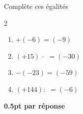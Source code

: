 
\question[2]
Complète ces égalités

\vspace{10pt}
\setlength{\columnsep}{50pt}
\begin{multicols}{2}
\begin{enumerate}[leftmargin=*,align=parleft, label=\alph*), itemsep=25pt]
\item {} $+ (-6)= (-9)$
\item $(+15)\, \cdot$ $=(-30)$
\item {} $- (-23) = (-59)$
\item $(+144) :$  $=(-6)$
\end{enumerate}
\end{multicols}
\setlength{\columnsep}{10pt}

\begin{solution}[0pt]
\textbf{0.5pt par réponse}
\end{solution}


